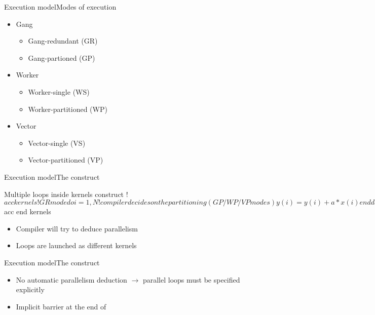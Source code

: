 \documentclass[12pt,aspectratio=169]{beamer}
\begin{document}
\begin{frame}{Execution model}{Modes of execution}
  \begin{itemize}
  \item Gang
    \begin{itemize}
    \item Gang-redundant (GR)
    \item Gang-partioned (GP)
    \end{itemize}
  \item Worker
    \begin{itemize}
    \item Worker-single (WS)
    \item Worker-partitioned (WP)
    \end{itemize}
  \item Vector
    \begin{itemize}
    \item Vector-single (VS)
    \item Vector-partitioned (VP)
    \end{itemize}
  \end{itemize}
\end{frame}

\begin{frame}[fragile]{Execution model}{The  construct}
  \begin{Fortranlisting}{Multiple loops inside kernels construct}
!$acc kernels
    !GR mode
    do i = 1, N
        !compiler decides on the partitioning (GP/WP/VP modes)
        y(i) = y(i) + a*x(i)
    enddo
    do i = 1, N
        !compiler decides on the partitioning (GP/WP/VP modes)
        y(i) = b*y(i) + a*x(i)
    enddo
!$acc end kernels
  \end{Fortranlisting}
  \begin{itemize}
  \item Compiler will try to deduce parallelism
  \item Loops are launched as different kernels
  \end{itemize}
\end{frame}

\begin{frame}[fragile]{Execution model}{The  construct}
  \begin{itemize}
  \item No automatic parallelism deduction $\rightarrow$ parallel loops must
    be specified explicitly
  \item Implicit barrier at the end of 
  \end{itemize}
\end{frame}
\end{document}
